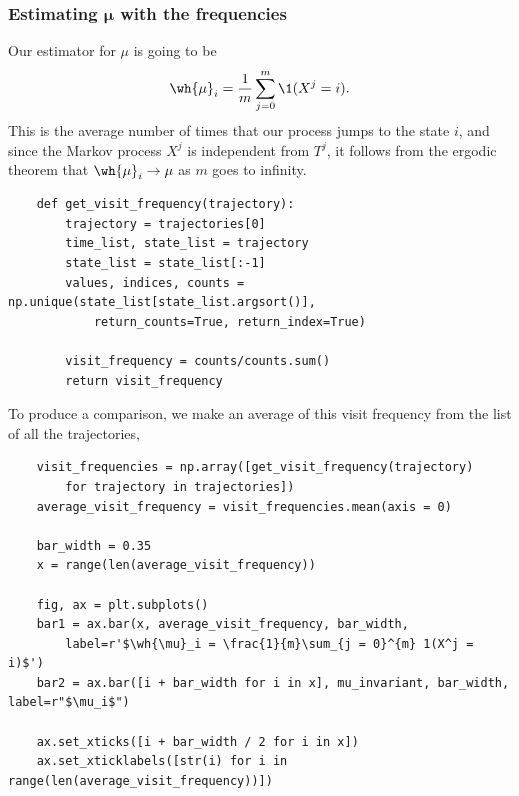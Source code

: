 \subsubsection*{Estimating $\boldsymbol{\mu}$ with the frequencies}

Our estimator for $\mu$ is going to be
\[ \wh{\mu}_i = \frac{1}{m}\sum_{j = 0}^{m} \1(X^j = i). \]
This is the average number of times that our process jumps to the state $i$, and since the Markov process $X^j$ is independent from $T^j$, it follows from the ergodic theorem that $\wh{\mu}_i \to \mu$ as $m$ goes to infinity.
\begin{verbatim}
    def get_visit_frequency(trajectory):
        trajectory = trajectories[0]
        time_list, state_list = trajectory
        state_list = state_list[:-1]
        values, indices, counts = np.unique(state_list[state_list.argsort()], 
            return_counts=True, return_index=True)
        
        visit_frequency = counts/counts.sum()
        return visit_frequency
\end{verbatim}
To produce a comparison, we make an average of this visit frequency from the list of all the trajectories,
\begin{verbatim}
    visit_frequencies = np.array([get_visit_frequency(trajectory) 
        for trajectory in trajectories])
    average_visit_frequency = visit_frequencies.mean(axis = 0)

    bar_width = 0.35
    x = range(len(average_visit_frequency))

    fig, ax = plt.subplots()
    bar1 = ax.bar(x, average_visit_frequency, bar_width,
        label=r'$\wh{\mu}_i = \frac{1}{m}\sum_{j = 0}^{m} 1(X^j = i)$')
    bar2 = ax.bar([i + bar_width for i in x], mu_invariant, bar_width, label=r"$\mu_i$")

    ax.set_xticks([i + bar_width / 2 for i in x])
    ax.set_xticklabels([str(i) for i in range(len(average_visit_frequency))])
\end{verbatim}


